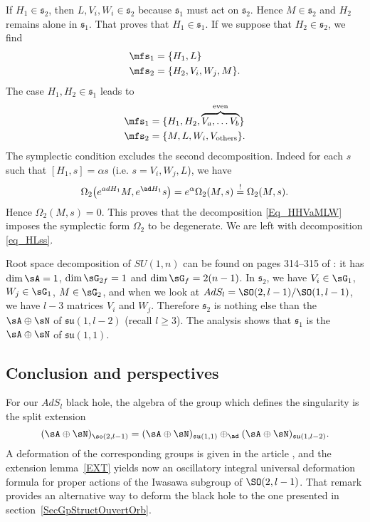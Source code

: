 If $H_1\in\mathfrak{s}_2$, then $L,V_i,W_i\in\mathfrak{s}_2$ because $\mathfrak{s}_1$ must act on $\mathfrak{s}_2$. Hence $M\in\mathfrak{s}_2$ and $H_2$ remains alone in $\mathfrak{s}_1$. That proves that $H_1\in\mathfrak{s}_1$. If we suppose that $H_2\in\mathfrak{s}_2$, we find
\begin{equation}  \label{eq_HLss}
 \begin{split}
  \mfs_1&=\{ H_1,L  \}\\
\mfs_2&=\{ H_2,V_i,W_j,M  \}.
\end{split}
\end{equation}
The case $H_1,H_2\in\mathfrak{s}_1$ leads to
\begin{equation}   \label{Eq_HHVaMLW}
 \begin{split}
	\mfs_1&=\{ H_1,H_2,\overbrace{V_a,\ldots V_b}^{\text{even}}  \}\\
	\mfs_2&=\{ M,L,W_i,V_{\text{others}}  \}.
\end{split}
\end{equation}
The symplectic condition excludes the second decomposition. Indeed for each $s$ such that $[H_1,s]=\alpha s$ (i.e. $s=V_i,W_j,L$), we have
\[
  \Omega_2\big(  e^{ad H_1}M, e^{\ad H_1}s \big)= e^{\alpha}\Omega_2(M,s)\stackrel{!}{=}\Omega_2(M,s).
\]
Hence $\Omega_2(M,s)=0$. This proves that the decomposition \eqref{Eq_HHVaMLW} imposes the symplectic form $\Omega_2$ to be degenerate. We are left with decomposition \eqref{eq_HLss}.

Root space decomposition of $SU(1,n)$ can be found on pages 314--315 of \cite{Knapp}: it has $\dim\sA=1$, $\dim\sG_{2f}=1$ and $\dim\sG_f=2(n-1)$. In $\mathfrak{s}_2$, we have $V_i\in\sG_1$, $W_j\in\sG_1$, $M\in\sG_2$, and when we look at $AdS_l=\SO(2,l-1)/\SO(1,l-1)$, we have $l-3$ matrices $V_i$ and $W_j$. Therefore $\mathfrak{s}_2$ is nothing else than the $\sA\oplus\sN$ of $\mathfrak{su}(1,l-2)$ (recall $l\geq3$). The analysis shows that $\mathfrak{s}_1$ is the $\sA\oplus\sN$ of $\mathfrak{su}(1,1)$.

\subsection{Conclusion and perspectives}

For our $AdS_l$ black hole, the algebra of the group which defines the singularity is the split extension
\[
  (\sA\oplus\sN)_{\so(2,l-1)}=(\sA\oplus\sN)_{\mathfrak{su}(1,1)}\oplus_{\ad}(\sA\oplus\sN)_{\mathfrak{su}(1,l-2)}.
\]
A deformation of the corresponding groups is given in the article \cite{Biel-Massar}, and the extension lemma~\ref{EXT} yields now an oscillatory integral universal deformation formula for proper actions of the Iwasawa subgroup of $\SO(2,l-1)$. That remark provides an alternative way to deform the black hole to the one presented in section~\ref{SecGpStructOuvertOrb}.

